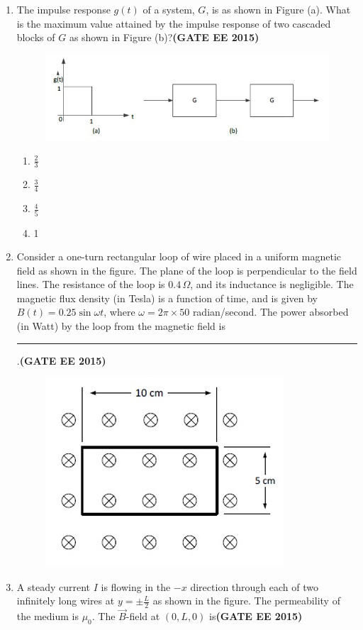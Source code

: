 \documentclass[a4paper,12pt]{exam}
\theoremstyle{remark}
\begin{document}
\begin{enumerate}
\item The impulse response    $g(t)   $ of a system,    $G   $, is as shown in Figure (a). What is the maximum value attained by the impulse response of two cascaded blocks of    $G   $ as shown in Figure (b)?\hfill{\textbf{(GATE EE 2015)}}
\begin{figure}[H]
    \centering
    \includegraphics[width=0.5\columnwidth]{figs/Q 20.png}
    \caption{}
    \label{fig:placeholder}
\end{figure}
\begin{multicols}{4}
\begin{enumerate}
    \item    $\frac{2}{3}   $
    \item    $\frac{3}{4}   $
    \item    $\frac{4}{5}   $
    \item 1
\end{enumerate}
\end{multicols}
\item Consider a one-turn rectangular loop of wire placed in a uniform magnetic field as shown in the figure. The plane of the loop is perpendicular to the field lines. The resistance of the loop is $0.4\,\Omega$, and its inductance is negligible. The magnetic flux density (in Tesla) is a function of time, and is given by $B(t) = 0.25\sin \omega t$, where $\omega = 2\pi \times 50$ radian/second. The power absorbed (in Watt) by the loop from the magnetic field is \rule{3cm}{0.15mm}.\hfill{\textbf{(GATE EE 2015)}}
\begin{figure}[H]
    \centering
    \includegraphics[width=0.4\columnwidth]{figs/Q 21.png}
    \caption{}
    \label{fig:placeholder}
\end{figure}
\newpage
\item A steady current $I$ is flowing in the $-x$ direction through each of two infinitely long wires at $y = \pm \frac{L}{2}$ as shown in the figure. The permeability of the medium is $\mu_0$. The $\vec{B}$-field at $(0, L, 0)$ is\hfill{\textbf{(GATE EE 2015)}}

\end{enumerate}
\end{document}
